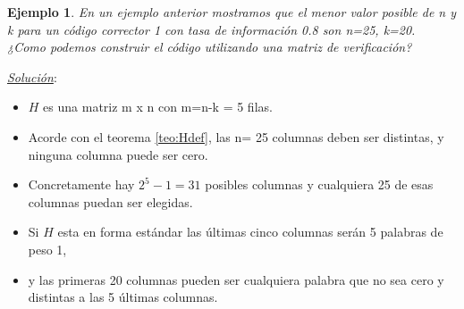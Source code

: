\documentclass{beamer}
\theoremstyle{plain}
\theoremstyle{example}
\theoremstyle{example}
\newtheorem{ejemplo} [Ejemplo] {Ejemplo}
\begin{document}
\begin{frame}  \footnotesize  

\begin{ejemplo}

En un ejemplo anterior mostramos que el menor valor posible de n y k para un código corrector 1 con tasa de información 0.8 son n=25, k=20.\\
\vspace{0.2cm}
¿Como podemos construir el código utilizando una matriz de verificación?\\

\end{ejemplo}

\textit{\underline{Solución}}:\\

\begin{itemize}
\item $H$ es una matriz m x n con m=n-k = 5 filas.
\item Acorde con el teorema \ref{teo:Hdef}, las n= 25 columnas deben ser distintas, y ninguna columna puede ser cero. 

\item Concretamente hay $2^5 -1=31$ posibles columnas y cualquiera  25 de esas columnas puedan ser elegidas.

\item Si $H$ esta en forma estándar las últimas cinco columnas serán 5 palabras de peso 1, 
\item y las primeras 20 columnas pueden ser cualquiera palabra que no sea cero y distintas a las 5 últimas columnas.
\end{itemize}

\end{frame} 
\end{document}
